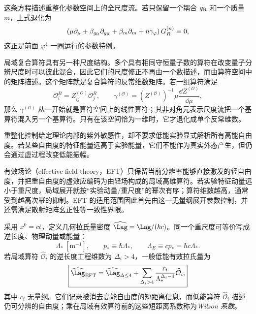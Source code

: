 这条方程描述重整化参数空间上的全尺度流。若只保留一个耦合 $g_{\rm R}$ 和一个质量 $m$，上式退化为
\[
 \left(
 \mu\partial_\mu+\beta_{g_{\rm R}}\partial_{g_{\rm R}}
 +\beta_m\partial_m+n\gamma_\varphi
 \right)G_R^{(n)}=0,
\]
这正是前面 $\varphi^4$ 一圈运行的参数特例。

局域复合算符具有另一种尺度结构。多个具有相同守恒量子数的算符在改变量子分辨尺度时可以彼此混合，因此它们的尺度修正不再由一个数描述，而由算符空间中的矩阵描述。这个矩阵就是复合算符的反常维数矩阵。若一组算符满足
\begin{equation}
\boxed{
 \mathcal O_i^B=Z_{ij}^{(\mathcal O)}\mathcal O_j^R,
 \qquad
 \gamma^{(\mathcal O)}
 =(Z^{(\mathcal O)})^{-1}\mu\frac{\dd Z^{(\mathcal O)}}{\dd\mu},}
\label{eq:operator-mixing-general-dp74}
\end{equation}
那么 $\gamma^{(\mathcal O)}$ 从一开始就是算符空间上的线性算符；其非对角元表示尺度流把一个基算符混入另一个基算符。只有在该空间恰为一维时，它才退化成单个反常维数。

\label{sec:qft-eft-unitarity-dp10}
重整化控制给定理论内部的紫外敏感性，却不要求低能实验显式解析所有高能自由度。若某些自由度的特征能量远高于实验能量，它们不能作为真实外态产生，但仍会通过虚过程改变低能振幅。

有效场论（effective field theory，EFT）只保留当前分辨率能够直接激发的轻自由度，并把重自由度的虚效应编码为由轻场构成的局域高维算符。若实验特征动量远小于重尺度，局域展开就按“实验动量/重尺度”的幂次有序；算符维数越高，通常受到越高次幂的抑制。EFT 的适用范围因此首先由这一无量纲展开参数控制，并还需满足散射矩阵幺正性等一致性界限。

采用 \(x^0=ct\)，定义几何拉氏量密度 \(\widehat\Lag=\Lag/(\hbar c)\)。同一个重尺度可等价写成逆长度、物理动量或能量：
\begin{equation}
 \boxed{
 \Lambda_*\ [\mathrm{m^{-1}}],
 \qquad
 p_*\equiv\hbar\Lambda_*,
 \qquad
 \Lambda_E\equiv cp_*=\hbar c\Lambda_*.}
 \label{eq:qft-eft-three-scales-dp42}
\end{equation}
若局域算符 \(\widehat{\mathcal O}_i\) 的逆长度工程维数为 \(\Delta_i>4\)，一般低能有效拉氏量为
\begin{equation}
 \boxed{
 \widehat\Lag_{\rm EFT}
 =\widehat\Lag_{\Delta\le4}
 +\sum_{\Delta_i>4}
 \frac{c_i}{\Lambda_*^{\Delta_i-4}}
 \widehat{\mathcal O}_i,}
 \label{eq:eft-operator-suppression-dp10}
\end{equation}
其中 \(c_i\) 无量纲。它们记录被消去高能自由度的短距离信息，而低能算符 \(\widehat{\mathcal O}_i\) 描述仍可分辨的自由度；乘在局域有效算符前的这些短距离系数称为\emph{Wilson 系数}。

